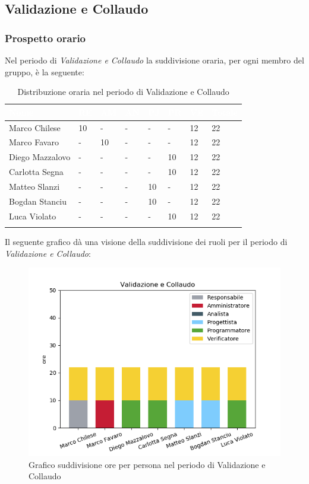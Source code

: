 \newpage
\subsection{Validazione e Collaudo}
\label{PVC}
\subsubsection{Prospetto orario}
Nel periodo di \textit{Validazione e Collaudo} la suddivisione oraria, per ogni membro del gruppo, è la seguente:

\begin{longtable}{|C{.30\textwidth}|C{.06\textwidth}|C{.06\textwidth}|C{.06\textwidth} | C{.06\textwidth}| C{.06\textwidth} | C{.06\textwidth} | C{.10\textwidth} |}
	\hline
{}	\textbf{\textcolor{white}{Nome}} & \textbf{\textcolor{white}{RE}} & \textbf{\textcolor{white}{AM}} & \textbf{\textcolor{white}{AN}} & \textbf{\textcolor{white}{PJ}} & \textbf{\textcolor{white}{PR}} & \textbf{\textcolor{white}{VE}} & \textbf{\textcolor{white}{Totale}}\\
	\hline 
	Marco Chilese & 10 & - & - & - & - & 12 & 22 \\
	\hline
	Marco Favaro &  - & 10 & - & - & - & 12 & 22 \\
	\hline
	Diego Mazzalovo & - & - & - & - & 10 & 12 & 22 \\
	\hline
	Carlotta Segna & - & - & - & - & 10 & 12 & 22 \\
	\hline
	Matteo Slanzi & - & - & - & 10 & - & 12 & 22 \\
	\hline
	Bogdan Stanciu & - & - & - & 10 & - & 12 & 22 \\
	\hline
	Luca Violato & - & - & - & - & 10 & 12 & 22 \\   
	\hline
	
	
	\caption{Distribuzione oraria nel periodo di Validazione e Collaudo}
	\label{Distribuzione oraria vc}
\end{longtable}

Il seguente grafico dà una visione della suddivisione dei ruoli per il periodo di \textit{Validazione e Collaudo}:

\begin{figure}[H]
	\centering
	\includegraphics[width=0.8\linewidth]{./images/fig_vc.png}
	\caption{Grafico suddivisione ore per persona nel periodo di Validazione e Collaudo}
	\label{fig:grafico suddivione ruoli periodo vc}
\end{figure}


